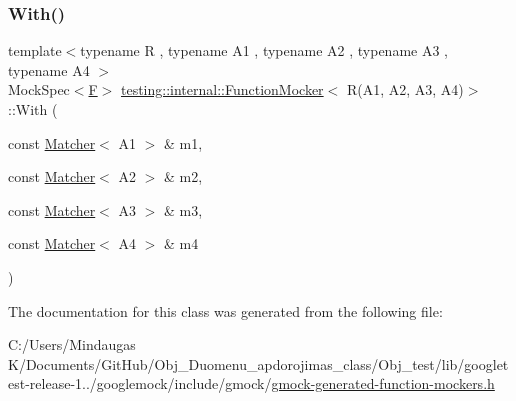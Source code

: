 \mbox{\label{classtesting_1_1internal_1_1_function_mocker_3_01_r_07_a1_00_01_a2_00_01_a3_00_01_a4_08_4_aee6e908e8409a52c44d3a8abd2bead99}} 
\subsubsection{\texorpdfstring{With()}{With()}}
{\footnotesize\ttfamily template$<$typename R , typename A1 , typename A2 , typename A3 , typename A4 $>$ \\
Mock\+Spec$<$\mbox{\hyperlink{classtesting_1_1internal_1_1_function_mocker_3_01_r_07_a1_00_01_a2_00_01_a3_00_01_a4_08_4_a9be04bb962edb1458c857ca8e9db9318}{F}}$>$ \mbox{\hyperlink{classtesting_1_1internal_1_1_function_mocker}{testing\+::internal\+::\+Function\+Mocker}}$<$ R(A1, A2, A3, A4)$>$\+::With (\begin{DoxyParamCaption}\item[{const \mbox{\hyperlink{classtesting_1_1_matcher}{Matcher}}$<$ A1 $>$ \&}]{m1,  }\item[{const \mbox{\hyperlink{classtesting_1_1_matcher}{Matcher}}$<$ A2 $>$ \&}]{m2,  }\item[{const \mbox{\hyperlink{classtesting_1_1_matcher}{Matcher}}$<$ A3 $>$ \&}]{m3,  }\item[{const \mbox{\hyperlink{classtesting_1_1_matcher}{Matcher}}$<$ A4 $>$ \&}]{m4 }\end{DoxyParamCaption})\hspace{0.3cm}{\ttfamily [inline]}}



The documentation for this class was generated from the following file\+:\begin{DoxyCompactItemize}
\item 
C\+:/\+Users/\+Mindaugas K/\+Documents/\+Git\+Hub/\+Obj\+\_\+\+Duomenu\+\_\+apdorojimas\+\_\+class/\+Obj\+\_\+test/lib/googletest-\/release-\/1../googlemock/include/gmock/\mbox{\hyperlink{_obj__test_2lib_2googletest-release-1_88_81_2googlemock_2include_2gmock_2gmock-generated-function-mockers_8h}{gmock-\/generated-\/function-\/mockers.\+h}}\end{DoxyCompactItemize}
